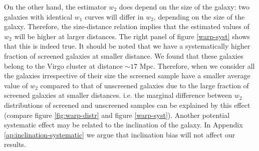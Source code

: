 \documentclass[useAMS,usenatbib,twocolumn]{mn2e}
\begin{document}
On the other hand, the estimator $w_2$ does depend
on the size of the galaxy: two galaxies with identical $w_1$ curves
will differ in $w_2$,
depending on the size of the galaxy. Therefore, the
size-distance relation implies that the estimated values of $w_2$ will be
higher at larger distances. The right panel of figure \ref{warp-syst}
shows that this is indeed true. It should be noted that we have a
systematically higher fraction of screened galaxies at smaller distance. We
found that these galaxies belong to the Virgo cluster at distance $\sim 17$
Mpc. Therefore, when we consider all the galaxies irrespective of their size
the screened sample have a smaller average value of $w_2$ compared to that of
unscreened galaxies due to the large fraction of screened galaxies at smaller
distances. i.e. the marginal difference between $w_2$ distributions of screened
and unscreened samples can be explained by this effect (compare figure
\ref{fig:warp-distr} and figure \ref{warp-syst}). Another potential systematic
effect may be related to the inclination of the galaxy.  In Appendix
\ref{ap:inclination-systematic} we argue that inclination bias will not
affect our results.
\end{document}
